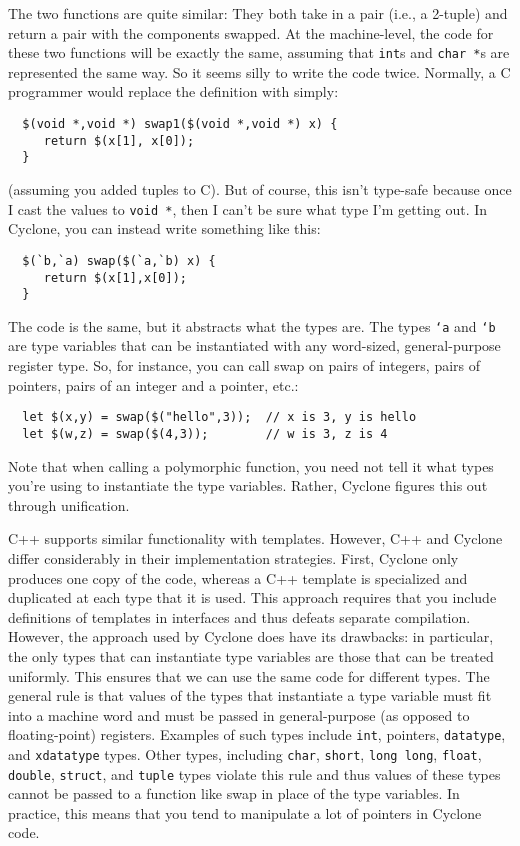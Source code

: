 The two functions are quite similar: They both take in a pair (i.e., a
2-tuple) and return a pair with the components swapped.  At the
machine-level, the code for these two functions will be exactly the
same, assuming that \texttt{int}s and \texttt{char *}s are
represented the same way.  So it seems silly to write the code twice.
Normally, a C programmer would replace the definition with simply:
\begin{verbatim}
  $(void *,void *) swap1($(void *,void *) x) {
     return $(x[1], x[0]);
  }
\end{verbatim}
(assuming you added tuples to C).  But of course, this isn't type-safe
because once I cast the values to \texttt{void *}, then I can't be sure
what type I'm getting out.  In Cyclone, you can instead write
something like this:
\begin{verbatim}
  $(`b,`a) swap($(`a,`b) x) {
     return $(x[1],x[0]);
  }
\end{verbatim}
The code is the same, but it abstracts what the types are.  The types
\texttt{`a} and \texttt{`b} are type variables that can be instantiated
with any word-sized, general-purpose register type.  So, for instance,
you can call swap on pairs of integers, pairs of pointers, pairs of an
integer and a pointer, etc.:
\begin{verbatim}
  let $(x,y) = swap($("hello",3));  // x is 3, y is hello
  let $(w,z) = swap($(4,3));        // w is 3, z is 4
\end{verbatim}

Note that when calling a polymorphic function, you need not tell it
what types you're using to instantiate the type variables.  Rather,
Cyclone figures this out through unification.

C++ supports similar functionality with templates.  However, C++ and
Cyclone differ considerably in their implementation strategies.
First, Cyclone only produces one copy of the code, whereas a C++
template is specialized and duplicated at each type that it is used.
This approach requires that you include definitions of templates in
interfaces and thus defeats separate compilation.  However, the
approach used by Cyclone does have its drawbacks: in particular, the
only types that can instantiate type variables are those that can be
treated uniformly.  This ensures that we can use the same code for
different types.  The general rule is that values of the types that
instantiate a type variable must fit into a machine word and must be
passed in general-purpose (as opposed to floating-point) registers.
Examples of such types include \texttt{int}, pointers, \texttt{datatype},
and \texttt{xdatatype} types.  Other types, including \texttt{char},
\texttt{short}, \texttt{long long}, \texttt{float}, \texttt{double},
\texttt{struct}, and \texttt{tuple} types violate this rule and thus
values of these types cannot be passed to a function like swap in
place of the type variables. In practice, this means that you tend to
manipulate a lot of pointers in Cyclone code.

